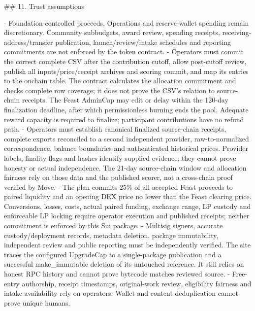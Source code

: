 \documentclass[11pt]{article}
\begin{document}
 \#\# 11. Trust assumptions

- Foundation-controlled proceeds, Operations and reserve-wallet spending remain discretionary. Community subbudgets, award review, spending receipts, receiving-address/transfer publication, launch/review/intake schedules and reporting commitments are not enforced by the token contract. - Operators must commit the correct complete CSV after the contribution cutoff, allow post-cutoff review, publish all inputs/price/receipt archives and scoring commit, and map its entries to the onchain table. The contract calculates the allocation commitment and checks complete row coverage; it does not prove the CSV's relation to source-chain receipts. The Feast AdminCap may edit or delay within the 120-day finalization deadline, after which permissionless burning ends the pool. Adequate reward capacity is required to finalize; participant contributions have no refund path. - Operators must establish canonical finalized source-chain receipts, complete exports reconciled to a second independent provider, raw-to-normalized correspondence, balance boundaries and authenticated historical prices. Provider labels, finality flags and hashes identify supplied evidence; they cannot prove honesty or actual independence. The 21-day source-chain window and allocation fairness rely on those data and the published scorer, not a cross-chain proof verified by Move. - The plan commits 25\% of all accepted Feast proceeds to paired liquidity and an opening DEX price no lower than the Feast clearing price. Conversions, losses, costs, actual paired funding, exchange range, LP custody and enforceable LP locking require operator execution and published receipts; neither commitment is enforced by this Sui package. - Multisig signers, accurate custody/deployment records, metadata deletion, package immutability, independent review and public reporting must be independently verified. The site traces the configured UpgradeCap to a single-package publication and a successful make\_immutable deletion of its untouched reference. It still relies on honest RPC history and cannot prove bytecode matches reviewed source. - Free-entry authorship, receipt timestamps, original-work review, eligibility fairness and intake availability rely on operators. Wallet and content deduplication cannot prove unique humans.
\end{document}
